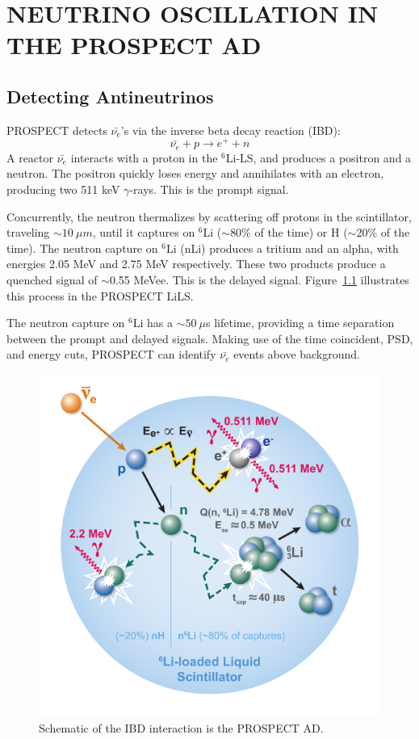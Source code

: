 \chapter{\uppercase{Neutrino Oscillation in the PROSPECT AD}}

\section{Detecting Antineutrinos}

PROSPECT detects $\bar{\nu_e}$'s via the inverse beta decay reaction (IBD):
\begin{equation}
	\bar{\nu_e} + p \rightarrow e^+ + n
\end{equation}
A reactor $\bar{\nu_e}$ interacts with a proton in the $^6$Li-LS, and produces a positron and a neutron.
The positron quickly loses energy and annihilates with an electron, producing two 511 keV $\gamma$-rays.
This is the prompt signal.

Concurrently, the neutron thermalizes by scattering off protons in the scintillator, traveling $\sim10~\mu m$, until it captures on $^6$Li ($\sim$80\% of the time) or H ($\sim$20\% of the time).
The neutron capture on $^6$Li (nLi) produces a tritium and an alpha, with energies 2.05 MeV and 2.75 MeV respectively.
These two products produce a quenched signal of $\sim$0.55 MeVee.
This is the delayed signal.
Figure~\ref{fig:ibd} illustrates this process in the PROSPECT LiLS.

The neutron capture on $^6$Li has a $\sim50~\mu$s lifetime, providing a time separation between the prompt and delayed signals.
Making use of the time coincident, PSD, and energy cuts, PROSPECT can identify $\bar{\nu_e}$ events above background. 

\begin{figure}[!t]
	\centering
	\includegraphics[width=0.4\linewidth]{tex/7-oscillation-images/IBD}
	\caption{Schematic of the IBD interaction is the PROSPECT AD.}
	\label{fig:ibd}
\end{figure}

